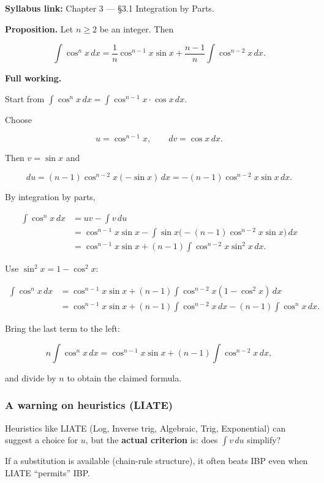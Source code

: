\begin{extension}[title={Extension (Tutorial 4, Question 5, Method 1: Reduction for $\cos^n x$)}]

\textbf{Syllabus link:} Chapter 3 — \S3.1 Integration by Parts.

\textbf{Proposition.} Let $n\ge 2$ be an integer. Then

\[
\int \cos^{n}x\,dx = \frac{1}{n}\cos^{n-1}x\sin x+\frac{n-1}{n}\int \cos^{n-2}x\,dx.
\]

\textbf{Full working.}

Start from $\displaystyle \int \cos^n x\,dx=\int \cos^{n-1}x\cdot \cos x\,dx$.

Choose

\[
u=\cos^{n-1}x,\qquad dv=\cos x\,dx.
\]

Then $v=\sin x$ and

\[
du=(n-1)\cos^{n-2}x(-\sin x)\,dx=-(n-1)\cos^{n-2}x\sin x\,dx.
\]

By integration by parts,

\begin{align*}
\int \cos^n x\,dx
&= uv-\int v\,du \\
&= \cos^{n-1}x\sin x-\int \sin x\big(-(n-1)\cos^{n-2}x\sin x\big)\,dx \\
&= \cos^{n-1}x\sin x+(n-1)\int \cos^{n-2}x\sin^2 x\,dx.
\end{align*}

Use $\sin^2x=1-\cos^2x$:

\begin{align*}
\int \cos^n x\,dx
&= \cos^{n-1}x\sin x+(n-1)\int \cos^{n-2}x(1-\cos^2x)\,dx \\
&= \cos^{n-1}x\sin x+(n-1)\int \cos^{n-2}x\,dx-(n-1)\int \cos^n x\,dx.
\end{align*}

Bring the last term to the left:

\[
n\int \cos^n x\,dx=\cos^{n-1}x\sin x+(n-1)\int \cos^{n-2}x\,dx,
\]

and divide by $n$ to obtain the claimed formula.

\end{extension}

\subsubsection*{A warning on heuristics (LIATE)}

\begin{commonmistake}[title={Common Mistake: Blindly following LIATE}]

Heuristics like LIATE (Log, Inverse trig, Algebraic, Trig, Exponential) can suggest a choice for $u$, but the \textbf{actual criterion} is: does $\int v\,du$ simplify?

If a substitution is available (chain-rule structure), it often beats IBP even when LIATE ``permits'' IBP.

\end{commonmistake}

